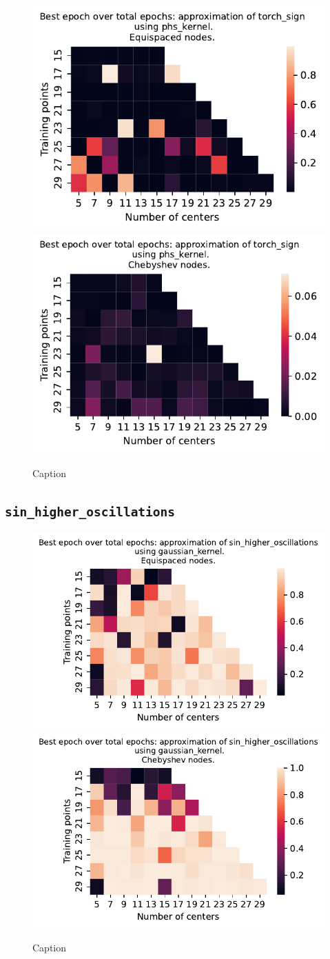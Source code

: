 \documentclass[12pt]{report} %
\begin{document}
\begin{figure}[ht]
  \centering
  \includegraphics[width=.49\textwidth]{imagenes/experiments/1d/variational_epochs/torch_sign-Kphs_kernel-Equi-epochs.pdf}
  \includegraphics[width=.49\textwidth]{imagenes/experiments/1d/variational_epochs/torch_sign-Kphs_kernel-Cheb-epochs.pdf}
  \caption{Caption}
  \label{fig:epochs-torch-sign-phs}
\end{figure}

\clearpage
\subsection*{\texttt{sin\_higher\_oscillations}}

\begin{figure}[ht]
  \centering

  \includegraphics[width=.49\textwidth]{imagenes/experiments/1d/variational_epochs/sin_higher_oscillations-Kgaussian_kernel-Equi-epochs.pdf}
  \includegraphics[width=.49\textwidth]{imagenes/experiments/1d/variational_epochs/sin_higher_oscillations-Kgaussian_kernel-Cheb-epochs.pdf}
  \caption{Caption}
  \label{fig:epochs-sin-higher-oscillations-gaussian}
\end{figure}
\end{document}
